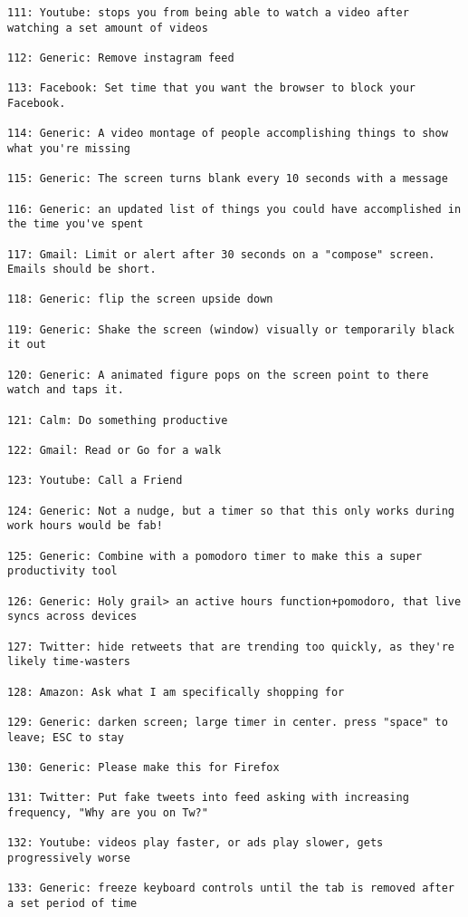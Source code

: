 \begin{lstlisting}[breaklines]
111: Youtube: stops you from being able to watch a video after watching a set amount of videos

112: Generic: Remove instagram feed

113: Facebook: Set time that you want the browser to block your Facebook.

114: Generic: A video montage of people accomplishing things to show what you're missing

115: Generic: The screen turns blank every 10 seconds with a message

116: Generic: an updated list of things you could have accomplished in the time you've spent

117: Gmail: Limit or alert after 30 seconds on a "compose" screen. Emails should be short.

118: Generic: flip the screen upside down

119: Generic: Shake the screen (window) visually or temporarily black it out

120: Generic: A animated figure pops on the screen point to there watch and taps it.

121: Calm: Do something productive

122: Gmail: Read or Go for a walk

123: Youtube: Call a Friend

124: Generic: Not a nudge, but a timer so that this only works during work hours would be fab!

125: Generic: Combine with a pomodoro timer to make this a super productivity tool

126: Generic: Holy grail> an active hours function+pomodoro, that live syncs across devices

127: Twitter: hide retweets that are trending too quickly, as they're likely time-wasters

128: Amazon: Ask what I am specifically shopping for

129: Generic: darken screen; large timer in center. press "space" to leave; ESC to stay

130: Generic: Please make this for Firefox

131: Twitter: Put fake tweets into feed asking with increasing frequency, "Why are you on Tw?"

132: Youtube: videos play faster, or ads play slower, gets progressively worse

133: Generic: freeze keyboard controls until the tab is removed after a set period of time


\end{lstlisting}
